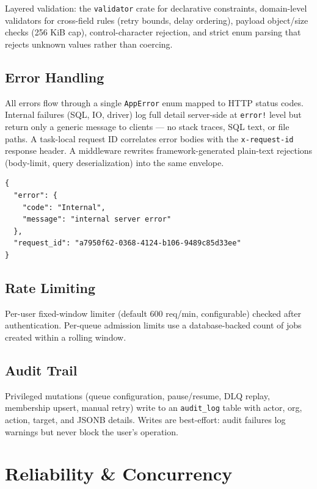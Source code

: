 \documentclass[11pt,a4paper]{article}
\begin{document}
Layered validation: the \texttt{validator} crate for declarative constraints,
domain-level validators for cross-field rules (retry bounds, delay ordering),
payload object/size checks (256 KiB cap), control-character rejection, and
strict enum parsing that rejects unknown values rather than coercing.

\subsection{Error Handling}

All errors flow through a single \texttt{AppError} enum mapped to HTTP status
codes. Internal failures (SQL, IO, driver) log full detail server-side at
\texttt{error!} level but return only a generic message to clients — no stack
traces, SQL text, or file paths. A task-local request ID correlates error
bodies with the \texttt{x-request-id} response header. A middleware rewrites
framework-generated plain-text rejections (body-limit, query deserialization)
into the same envelope.

\begin{lstlisting}[language={},caption={Standard error envelope returned to clients}]
{
  "error": {
    "code": "Internal",
    "message": "internal server error"
  },
  "request_id": "a7950f62-0368-4124-b106-9489c85d33ee"
}
\end{lstlisting}

\subsection{Rate Limiting}

Per-user fixed-window limiter (default 600 req/min, configurable) checked
after authentication. Per-queue admission limits use a database-backed count
of jobs created within a rolling window.

\subsection{Audit Trail}

Privileged mutations (queue configuration, pause/resume, DLQ replay, membership
upsert, manual retry) write to an \texttt{audit\_log} table with actor, org,
action, target, and JSONB details. Writes are best-effort: audit failures log
warnings but never block the user's operation.

\section{Reliability \& Concurrency}
\end{document}
